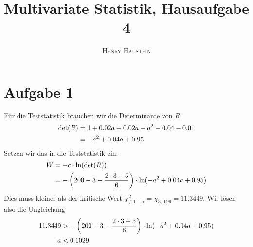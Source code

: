 \documentclass{article}
\title{\textbf{Multivariate Statistik, Hausaufgabe 4}}
\author{\textsc{Henry Haustein}}
\date{}
\begin{document}
	\maketitle
	
	\section*{Aufgabe 1}
	Für die Teststatistik brauchen wir die Determinante von $R$:
	\begin{align}
		\det(R) &= 1+0.02a + 0.02a - a^2 - 0.04 - 0.01 \notag \\
		&= -a^2 + 0.04a + 0.95 \notag
	\end{align}
	Setzen wir das in die Teststatistik ein:
	\begin{align}
		W &= -c \cdot \ln(\det(R)) \notag \\
		&= -\left(200-3-\frac{2\cdot 3+5}{6}\right)\cdot \ln(-a^2 + 0.04a + 0.95) \notag
	\end{align}
	Dies muss kleiner als der kritische Wert $\chi_{f;1-\alpha}^2=\chi_{3,0.99}=11.3449$. Wir lösen also die Ungleichung
	\begin{align}
		11.3449 &> -\left(200-3-\frac{2\cdot 3+5}{6}\right)\cdot \ln(-a^2 + 0.04a + 0.95) \notag \\
		a &< 0.1029 \notag
	\end{align}
	
\end{document}
